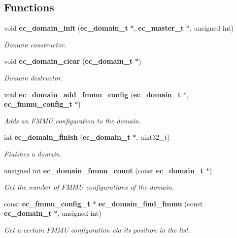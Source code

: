 \subsection*{\-Functions}
\begin{DoxyCompactItemize}
\item 
void {\bf ec\-\_\-domain\-\_\-init} ({\bf ec\-\_\-domain\-\_\-t} $\ast$, {\bf ec\-\_\-master\-\_\-t} $\ast$, unsigned int)\label{domain_8h_a62277a562703ecfbf3aad9e3b0ad8c75}

\begin{DoxyCompactList}\small\item\em \-Domain constructor. \end{DoxyCompactList}\item 
void {\bf ec\-\_\-domain\-\_\-clear} ({\bf ec\-\_\-domain\-\_\-t} $\ast$)\label{domain_8h_a0673cfe6b046dbc8160068ef776fd0b1}

\begin{DoxyCompactList}\small\item\em \-Domain destructor. \end{DoxyCompactList}\item 
void {\bf ec\-\_\-domain\-\_\-add\-\_\-fmmu\-\_\-config} ({\bf ec\-\_\-domain\-\_\-t} $\ast$, {\bf ec\-\_\-fmmu\-\_\-config\-\_\-t} $\ast$)\label{domain_8h_a145e578c728c987fb2764ea7c30439f1}

\begin{DoxyCompactList}\small\item\em \-Adds an \-F\-M\-M\-U configuration to the domain. \end{DoxyCompactList}\item 
int {\bf ec\-\_\-domain\-\_\-finish} ({\bf ec\-\_\-domain\-\_\-t} $\ast$, uint32\-\_\-t)
\begin{DoxyCompactList}\small\item\em \-Finishes a domain. \end{DoxyCompactList}\item 
unsigned int {\bf ec\-\_\-domain\-\_\-fmmu\-\_\-count} (const {\bf ec\-\_\-domain\-\_\-t} $\ast$)\label{domain_8h_ae3b2fb4aa807084750214357bdba897a}

\begin{DoxyCompactList}\small\item\em \-Get the number of \-F\-M\-M\-U configurations of the domain. \end{DoxyCompactList}\item 
const {\bf ec\-\_\-fmmu\-\_\-config\-\_\-t} $\ast$ {\bf ec\-\_\-domain\-\_\-find\-\_\-fmmu} (const {\bf ec\-\_\-domain\-\_\-t} $\ast$, unsigned int)
\begin{DoxyCompactList}\small\item\em \-Get a certain \-F\-M\-M\-U configuration via its position in the list. \end{DoxyCompactList}\end{DoxyCompactItemize}


